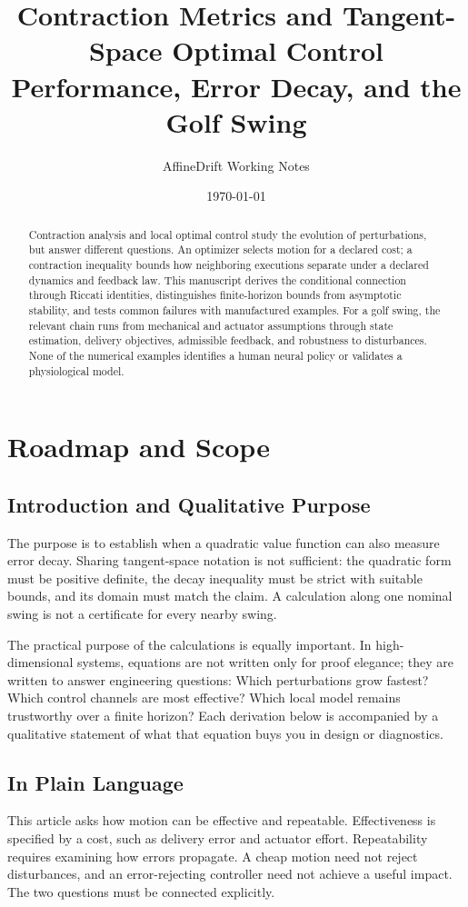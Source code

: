 \documentclass[11pt,letterpaper]{article}
\title{Contraction Metrics and Tangent-Space Optimal Control\\\large Performance, Error Decay, and the Golf Swing}
\author{AffineDrift Working Notes}
\date{\today}
\begin{document}
\maketitle
\setcounter{tocdepth}{1}

\begin{abstract}
Contraction analysis and local optimal control study the evolution of perturbations, but answer different questions. An optimizer selects motion for a declared cost; a contraction inequality bounds how neighboring executions separate under a declared dynamics and feedback law. This manuscript derives the conditional connection through Riccati identities, distinguishes finite-horizon bounds from asymptotic stability, and tests common failures with manufactured examples. For a golf swing, the relevant chain runs from mechanical and actuator assumptions through state estimation, delivery objectives, admissible feedback, and robustness to disturbances. None of the numerical examples identifies a human neural policy or validates a physiological model.
\end{abstract}

\tableofcontents
\newpage

\section{Roadmap and Scope}

\subsection{Introduction and Qualitative Purpose}
The purpose is to establish when a quadratic value function can also measure error decay. Sharing tangent-space notation is not sufficient: the quadratic form must be positive definite, the decay inequality must be strict with suitable bounds, and its domain must match the claim. A calculation along one nominal swing is not a certificate for every nearby swing.

The practical purpose of the calculations is equally important. In high-dimensional systems, equations are not written only for proof elegance; they are written to answer engineering questions: Which perturbations grow fastest? Which control channels are most effective? Which local model remains trustworthy over a finite horizon? Each derivation below is accompanied by a qualitative statement of what that equation buys you in design or diagnostics.

\subsection{In Plain Language}
This article asks how motion can be effective and repeatable. Effectiveness is specified by a cost, such as delivery error and actuator effort. Repeatability requires examining how errors propagate. A cheap motion need not reject disturbances, and an error-rejecting controller need not achieve a useful impact. The two questions must be connected explicitly.
\end{document}
